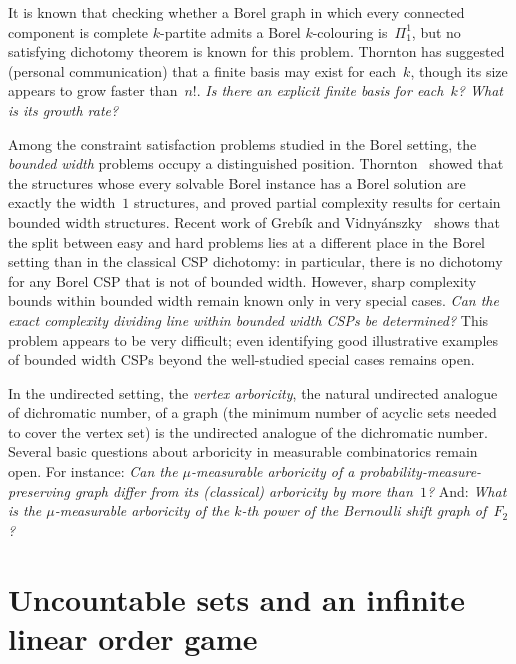 \begin{question}
	It is known that checking whether a Borel graph in which every connected component is complete $k$-partite admits a Borel $k$-colouring is~$\Pi^1_1$, but no satisfying dichotomy theorem is known for this problem.
	Thornton has suggested (personal communication) that a finite basis may exist for each~$k$, though its size appears to grow faster than~$n!$.
	\emph{Is there an explicit finite basis for each~$k$?  What is its growth rate?}
\end{question}

\begin{question}
	Among the constraint satisfaction problems studied in the Borel setting, the \emph{bounded width} problems occupy a distinguished position.
	Thornton~\cite{thornton2022algebraic} showed that the structures whose every solvable Borel instance has a Borel solution are exactly the width~$1$ structures, and proved partial complexity results for certain bounded width structures.
	Recent work of Grebík and Vidnyánszky~\cite{GV2025} shows that the split between easy and hard problems lies at a different place in the Borel setting than in the classical CSP dichotomy: in particular, there is no dichotomy for any Borel CSP that is not of bounded width.
	However, sharp complexity bounds within bounded width remain known only in very special cases.
	\emph{Can the exact complexity dividing line within bounded width CSPs be determined?}
	This problem appears to be very difficult; even identifying good illustrative examples of bounded width CSPs beyond the well-studied special cases remains open.
\end{question}

\begin{question}
	In the undirected setting, the \emph{vertex arboricity}, the natural undirected analogue of dichromatic number, of a graph (the minimum number of acyclic sets needed to cover the vertex set) is the undirected analogue of the dichromatic number.
	Several basic questions about arboricity in measurable combinatorics remain open.
	For instance:
	\emph{Can the $\mu$-measurable arboricity of a probability-measure-preserving graph differ from its (classical) arboricity by more than~$1$?}
	And: \emph{What is the $\mu$-measurable arboricity of the $k$-th power of the Bernoulli shift graph of~$F_2$?}
\end{question}

\section{Uncountable sets and an infinite linear order game}

